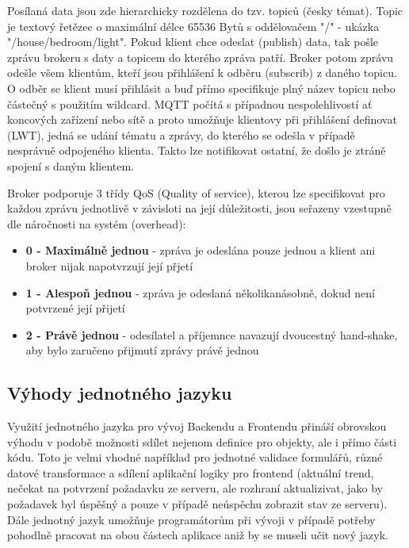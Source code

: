 Posílaná data jsou zde hierarchicky rozdělena do tzv. topiců (česky témat). Topic je textový řetězec o maximální délce 65536 Bytů s oddělovačem "/" - ukázka "/house/bedroom/light". Pokud klient chce odeslat (publish) data, tak pošle zprávu brokeru s daty a topicem do kterého zpráva patří. Broker potom zprávu odešle všem klientům, kteří jsou přihlášení k odběru (subscrib) z daného topicu. O odběr se klient musí přihlásit a buď přímo specifikuje plný název topicu nebo částečný s použitím wildcard. MQTT počítá s případnou nespolehlivostí ať koncových zařízení nebo sítě a proto umožňuje klientovy při přihlášení definovat  (LWT), jedná se udání tématu a zprávy, do kterého se odešla v případě nesprávně odpojeného klienta. Takto lze notifikovat ostatní, že došlo je ztráně spojení s daným klientem.

Broker podporuje 3 třídy QoS (Quality of service), kterou lze specifikovat pro každou zprávu jednotlivě v závisloti na její důležitosti, jsou seřazeny vzestupně dle náročnosti na systém (overhead):
\begin{itemize}
    \item \textbf{0 - Maximálně jednou} - zpráva je odeslána pouze jednou a klient ani broker nijak napotvrzují její přjetí
    \item \textbf{1 - Alespoň jednou} - zpráva je odeslaná několikanásobně, dokud není potvrzené její přijetí
    \item \textbf{2 - Právě jednou} - odesílatel a příjemnce navazují dvoucestný hand-shake, aby bylo zaručeno přijmutí zprávy právě jednou
\end{itemize}

\subsection{Výhody jednotného jazyku}
Využití jednotného jazyka pro vývoj Backendu a Frontendu přináší obrovskou výhodu v podobě možnosti sdílet nejenom definice pro objekty, ale i přímo části kódu. Toto je velmi vhodné například pro jednotné validace formulářů, různé datové transformace a sdílení aplikační logiky pro frontend  (aktuální trend, nečekat na potvrzení požadavku ze serveru, ale rozhraní aktualizivat, jako by požadavek byl úspěšný a pouze v případě neúspěchu zobrazit stav ze serveru). Dále jednotný jazyk umožňuje programátorům při vývoji v případě potřeby pohodlně pracovat na obou částech aplikace aniž by se museli učit nový jazyk.

